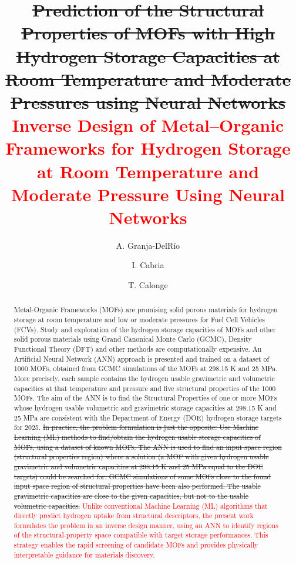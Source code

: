 \documentclass[review]{elsarticle}
\begin{document}

\begin{frontmatter}

\title{\sout{Prediction of the Structural Properties of MOFs with High Hydrogen Storage Capacities at Room Temperature and Moderate Pressures using Neural Networks} \textcolor{red}{Inverse Design of Metal–Organic Frameworks for Hydrogen Storage at Room Temperature and Moderate Pressure Using Neural Networks}}
\date{}
\author[1]{A. Granja-DelRío }
\author[1]{I. Cabria}
\author[2]{T. Calonge}
\address[1]{Departamento de F\'{\i}sica Te\'orica, At\'omica
y \'Optica, Universidad de Valladolid, ES-47011 Valladolid, Spain}
\address[2]{Departamento de Informática (ATC, CCIA y LSI),
Universidad de Valladolid, ES-47011 Valladolid, Spain}



\begin{abstract}
Metal-Organic Frameworks (MOFs) are promising 
solid porous materials for hydrogen storage at 
room temperature and low or moderate pressures for Fuel Cell Vehicles (FCVs). Study and exploration of the hydrogen storage capacities of MOFs and other solid porous materials using Grand Canonical Monte Carlo (GCMC), Density Functional Theory (DFT) and other methods are computationally expensive. An Artificial Neural Network (ANN) approach is presented and trained on a dataset of 1000 MOFs, obtained from GCMC simulations of the MOFs at 298.15 K and 25 MPa. More precisely, each sample contains the hydrogen usable gravimetric and volumetric capacities at that temperature and pressure and five structural properties of the 1000 MOFs. The aim of the ANN is to find the Structural Properties of one or more MOFs whose hydrogen usable volumetric and gravimetric storage capacities at 298.15 K and 25 MPa are consistent with the Department of Energy (DOE) hydrogen storage targets for 2025. \sout{In practice, the problem formulation is just the opposite: Use Machine Learning (ML) methods to find/obtain the hydrogen usable storage capacities of MOFs, using a dataset of known MOFs. The ANN is used to find an input space region (structural properties region) where a solution (a MOF with given hydrogen usable gravimetric and volumetric capacities at 298.15 K and 25 MPa equal to the DOE targets) could be searched for. GCMC simulations of some MOFs close to the found input space region of structural properties have been also performed. The usable gravimetric capacities are close to the given capacities, but not to the usable volumetric capacities. }
\textcolor{red}{
Unlike conventional Machine Learning (ML) algorithms that directly predict hydrogen uptake from structural descriptors, the present work formulates the problem in an inverse design manner, using an ANN to identify regions of the structural-property space compatible with target storage performances. This strategy enables the rapid screening of candidate MOFs and provides physically interpretable guidance for materials discovery.}


\end{abstract}
\end{frontmatter}
\end{document}
